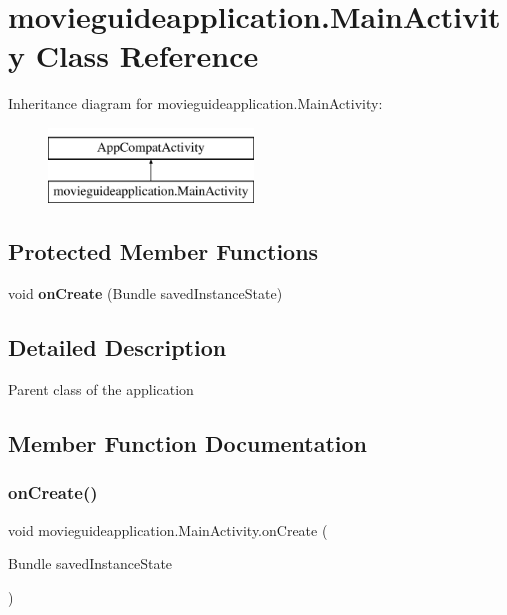 \section{movieguideapplication.\+Main\+Activity Class Reference}
\label{classmovieguideapplication_1_1_main_activity}
Inheritance diagram for movieguideapplication.\+Main\+Activity\+:\begin{figure}[H]
\begin{center}
\leavevmode
\includegraphics[height=2.000000cm]{classmovieguideapplication_1_1_main_activity}
\end{center}
\end{figure}
\subsection*{Protected Member Functions}
\begin{DoxyCompactItemize}
\item 
void \textbf{ on\+Create} (Bundle saved\+Instance\+State)
\end{DoxyCompactItemize}


\subsection{Detailed Description}
Parent class of the application 

\subsection{Member Function Documentation}
\mbox{\label{classmovieguideapplication_1_1_main_activity_a0e3b9ebf18a76a620b61408101b0de96}} 
\subsubsection{on\+Create()}
{\footnotesize\ttfamily void movieguideapplication.\+Main\+Activity.\+on\+Create (\begin{DoxyParamCaption}\item[{Bundle}]{saved\+Instance\+State }\end{DoxyParamCaption})\hspace{0.3cm}{\ttfamily [protected]}}

